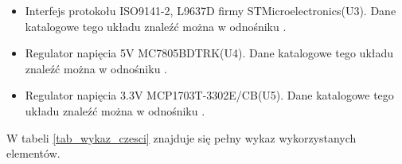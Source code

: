 \documentclass[12pt]{article} %
\numberwithin{equation}{subsection}
\numberwithin{figure}{section}
\numberwithin{table}{section}
\begin{document}
\begin{itemize}
{		}		
	
	\item{Interfejs protokołu ISO9141-2, L9637D firmy STMicroelectronics(U3). Dane katalogowe tego układu znaleźć można w odnośniku \cite{L9637D}.}
	\item{Regulator napięcia 5V MC7805BDTRK(U4). Dane katalogowe tego układu znaleźć można w odnośniku \cite{MC7805}.}
	
	\item{Regulator napięcia 3.3V MCP1703T-3302E/CB(U5). Dane katalogowe tego układu znaleźć można w odnośniku \cite{MCP17}.}
	
	\end{itemize}	
	
	\newpage
	
	W tabeli \ref{tab_wykaz_czesci} znajduje się pełny wykaz wykorzystanych elementów.
	
\end{document}
